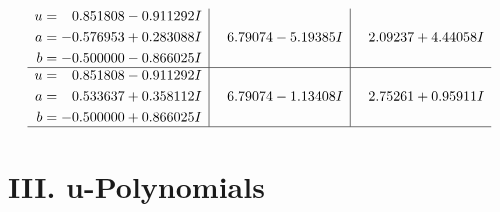 \documentclass[1p]{elsarticle_modified}
\theoremstyle{definition}
\begin{document}
$$\begin{array}{c|c|c}
\begin{aligned}
u &= \phantom{-}0.851808 - 0.911292 I \\
a &= -0.576953 + 0.283088 I \\
b &= -0.500000 - 0.866025 I\end{aligned}
 & \phantom{-}6.79074 - 5.19385 I & \phantom{-}2.09237 + 4.44058 I \\ \hline\begin{aligned}
u &= \phantom{-}0.851808 - 0.911292 I \\
a &= \phantom{-}0.533637 + 0.358112 I \\
b &= -0.500000 + 0.866025 I\end{aligned}
 & \phantom{-}6.79074 - 1.13408 I & \phantom{-}2.75261 + 0.95911 I\\
 \hline 
 \end{array}$$\newpage
\newpage\renewcommand{\arraystretch}{1}
\centering \section*{ III. u-Polynomials}
\end{document}
